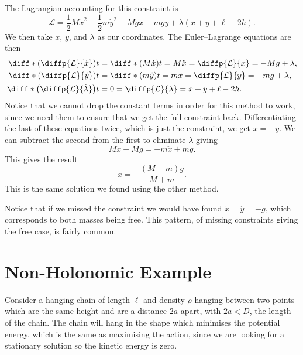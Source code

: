 \documentclass[fleqn]{NotesClass}
\newcommand*{\lagrangian}{\mathcal{L}}
\begin{document}
    The Lagrangian accounting for this constraint is
    \begin{equation}
        \lagrangian = \frac{1}{2}M\dot{x}^2 + \frac{1}{2}m\dot{y}^2 - Mgx - mgy + \lambda(x + y + \ell - 2h).
    \end{equation}
    We then take \(x\), \(y\), and \(\lambda\) as our coordinates.
    The Euler--Lagrange equations are then
    \begin{align}
        \diff*{\left( \diffp{\lagrangian}{\dot{x}} \right)}{t} &= \diff*{(M\dot{x})}{t} = M\ddot{x} = \diffp{\lagrangian}{x} = -Mg + \lambda,\\
        \diff*{\left( \diffp{\lagrangian}{\dot{y}} \right)}{t} &= \diff*{(m\dot{y})}{t} = m\ddot{x} = \diffp{\lagrangian}{y} = -mg + \lambda,\\
        \diff*{\left( \diffp{\lagrangian}{\dot{\lambda}} \right)}{t} &= 0 = \diffp{\lagrangian}{\lambda} = x + y + \ell - 2h.
    \end{align}
    Notice that we cannot drop the constant terms in order for this method to work, since we need them to ensure that we get the full constraint back.
    Differentiating the last of these equations twice, which is just the constraint, we get \(\ddot{x} = -\ddot{y}\).
    We can subtract the second from the first to eliminate \(\lambda\) giving
    \begin{equation}
        M\ddot{x} + Mg = -m\ddot{x} + mg.
    \end{equation}
    This gives the result
    \begin{equation}
        \ddot{x} = -\frac{(M - m)g}{M + m}.
    \end{equation}
    This is the same solution we found using the other method.
    
    Notice that if we missed the constraint we would have found \(\ddot{x} = \ddot{y} = -g\), which corresponds to both masses being free.
    This pattern, of missing constraints giving the free case, is fairly common.
    
    \section{Non-Holonomic Example}
    Consider a hanging chain of length \(\ell\) and density \(\rho\) hanging between two points which are the same height and are a distance \(2a\) apart, with \(2a < D\), the length of the chain.
    The chain will hang in the shape which minimises the potential energy, which is the same as maximising the action, since we are looking for a stationary solution so the kinetic energy is zero.
    
\end{document}
